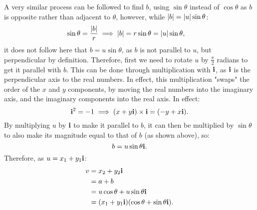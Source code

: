 \documentclass[10pt]{article}
\begin{document}
A very similar process can be followed to find $b$, using $\sin\theta$ instead of $\cos\theta$ as $b$ is opposite rather than adjacent to $\theta$, however, while $\abs{b} = \abs{u}\sin\theta$:
\begin{equation}
    \begin{aligned}
        \sin\theta = \frac{\abs{b}}{r} &\implies \abs{b} = r\sin\theta = \abs{u}\sin\theta,
    \end{aligned}
\end{equation}
it does not follow here that $b = u\sin\theta$, as $b$ is not parallel to $u$, but perpendicular by definition. Therefore, first we need to rotate $u$ by $\frac{\pi}{2}$ radians to get it parallel with $b$. This can be done through multiplication with $\vb{i}$, as $\vb{i}$ is the perpendicular axis to the real numbers. In effect, this multiplication "swaps" the order of the $x$ and $y$ components, by moving the real numbers into the imaginary axis, and the imaginary components into the real axis. In effect:
\begin{equation}
    \vb{i}^2 = -1 \implies (x + y\vb{i}) \times \vb{i} = (-y + x\vb{i}).
\end{equation}
By multiplying $u$ by $\vb{i}$ to make it parallel to $b$, it can then be multiplied by $\sin\theta$ to also make its magnitude equal to that of $b$ (as shown above), so:
\begin{equation}
    b = u\sin\theta\vb{i}.
\end{equation}
Therefore, as $u = x_1 + y_1\vb{i}$:
\begin{equation}
    \begin{aligned}
        v =\phantom{ } & x_2 + y_2\vb{i} \\
        =\phantom{ }& a + b \\
        =\phantom{ }& u\cos\theta + u\sin\theta\vb{i} \\
        =\phantom{ }& (x_1 + y_1\vb{i})(\cos\theta + \sin\theta\vb{i}).
    \end{aligned}
\end{equation}
\end{document}
